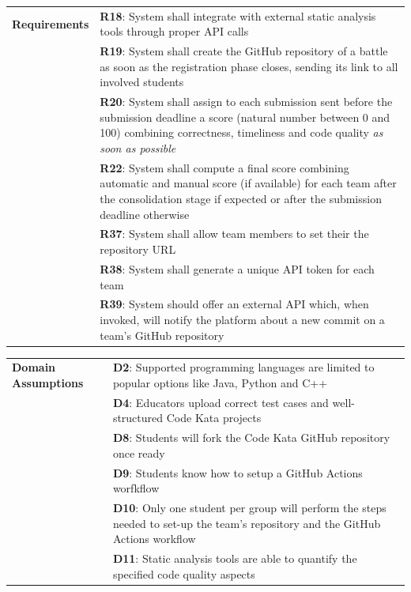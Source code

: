\begin{center}
    \begin{tabular}{ |m{3cm}|m{10cm}| }
        \hline
        \textbf{Requirements} 
        & \textbf{R18}: System shall integrate with external static analysis tools through proper API calls \\
        & \textbf{R19}: System shall create the GitHub repository of a battle as soon as the registration phase closes, sending its link to all involved students \\
        & \textbf{R20}: System shall assign to each submission sent before the submission deadline a score (natural number between 0 and 100) combining correctness, timeliness and code quality \textit{as soon as possible} \\
        & \textbf{R22}: System shall compute a final score combining automatic and manual score (if available) for each team after the consolidation stage if expected or after the submission deadline otherwise \\
        & \textbf{R37}: System shall allow team members to set their the repository URL \\
        & \textbf{R38}: System shall generate a unique API token for each team \\
        & \textbf{R39}: System should offer an external API which, when invoked, will notify the platform about a new commit on a team’s GitHub repository \\
        \hline
    \end{tabular}
    \begin{tabular}{ |m{3cm}|m{10cm}| }
        \hline
        \textbf{Domain \newline Assumptions} 
        & \textbf{D2}: Supported programming languages are limited to popular options like Java, Python and C++ \\
        & \textbf{D4}: Educators upload correct test cases and well-structured Code Kata projects \\
        & \textbf{D8}: Students will fork the Code Kata GitHub repository once ready \\
        & \textbf{D9}: Students know how to setup a GitHub Actions worfkflow \\
        & \textbf{D10}: Only one student per group will perform the steps needed to set-up the team's repository and the GitHub Actions workflow \\
        & \textbf{D11}: Static analysis tools are able to quantify the specified code quality aspects \\
        \hline
    \end{tabular}
\end{center} 
